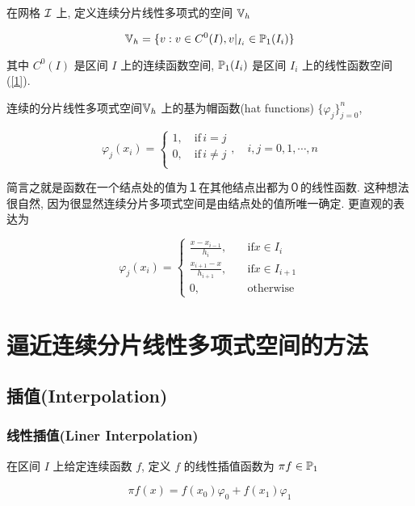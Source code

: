 \documentclass{article}
\begin{document}
在网格 ${\mathcal I}$ 上, 定义连续分片线性多项式的空间 ${\mathbb V}_h$

\begin{equation*}
    {\mathbb V}_h = \{v: v\in C^0(I), v|_{I_i} \in {\mathbb P}_1(I_i)\}
\end{equation*}

其中 $C^0(I)$ 是区间 $I$ 上的连续函数空间, ${\mathbb P}_1(I_i)$ 是区间 $I_i$ 上的线性函数空间(\ref{1}).

连续的分片线性多项式空间${\mathbb V}_h$ 上的基为帽函数(hat functions) $\{\varphi_j\}_{j = 0}^n$,

\begin{equation*}
    \varphi_j(x_i) = \begin{cases}
        1, \quad \text{if} \, i = j \\
        0, \quad \text{if} \, i \ne j \\
    \end{cases},
    \quad i, j = 0, 1, \cdots, n
\end{equation*}

简言之就是函数在一个结点处的值为１在其他结点出都为０的线性函数. 这种想法很自然, 因为很显然连续分片多项式空间是由结点处的值所唯一确定. 更直观的表达为

\begin{equation*}
	\varphi_j(x_i) = \begin{cases}
		\frac{x-x_{i-1}}{h_i}, & \quad \text{if}   x \in I_i \\
		\frac{x_{i+1}-x}{h_{i+1}},& \quad \text{if}  x \in I_{i+1} \\
		0, & \quad \text{otherwise}
		\end{cases}
\end{equation*}

\section{逼近连续分片线性多项式空间的方法}
\subsection{插值(Interpolation)}
\subsubsection{线性插值(Liner Interpolation)}

在区间 $I$ 上给定连续函数 $f$, 定义 $f$ 的线性插值函数为 $\pi f \in {\mathbb P}_1$ 

\begin{equation*}
    \pi f(x) = f(x_0)\varphi_0 + f(x_1)\varphi_1 
\end{equation*}
\end{document}
